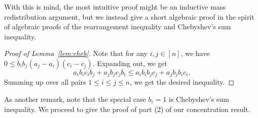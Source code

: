 \documentclass{amsart}
\theoremstyle{definition}
\begin{document}
With this is mind, the most intuitive proof might be an inductive mass redistribution argument, but we instead give a short algebraic proof in the spirit of algebraic proofs of the rearrangement inequality and Chebyshev's sum inequality.


\begin{proof}[Proof of Lemma~\ref{lem:cheb}]
Note that for any $i,j\in [n]$, we have $0\leq b_i b_j (a_j-a_i)(c_i-c_j)$. Expanding out, we get
\[a_i b_i c_i b_j+a_j b_j c_j b_i\leq a_i b_i b_j c_j +a_j b_j b_i c_i.\]
Summing up over all pairs $1\leq i\leq j\leq n$, we get the desired inequality.
\end{proof}

As another remark, note that the special case $b_i=1$ is Chebyshev's sum inequality. We proceed to give the proof of part (2) of our concentration result.
\end{document}
